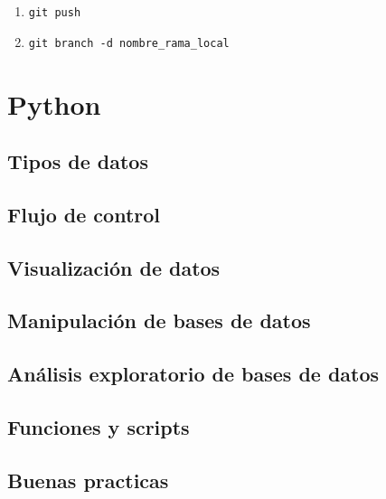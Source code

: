\documentclass[
]{book}
\begin{document}
\begin{enumerate}
\def\labelenumi{\arabic{enumi})}
\setcounter{enumi}{9}
\item
  \texttt{git\ push}
\item
  \texttt{git\ branch\ -d\ nombre\_rama\_local}
\end{enumerate}

\hypertarget{python}{%
\chapter{Python}\label{python}}

\hypertarget{tipos-de-datos}{%
\section{Tipos de datos}\label{tipos-de-datos}}

\hypertarget{flujo-de-control}{%
\section{Flujo de control}\label{flujo-de-control}}

\hypertarget{visualizaciuxf3n-de-datos}{%
\section{Visualización de datos}\label{visualizaciuxf3n-de-datos}}

\hypertarget{manipulaciuxf3n-de-bases-de-datos}{%
\section{Manipulación de bases de datos}\label{manipulaciuxf3n-de-bases-de-datos}}

\hypertarget{anuxe1lisis-exploratorio-de-bases-de-datos}{%
\section{Análisis exploratorio de bases de datos}\label{anuxe1lisis-exploratorio-de-bases-de-datos}}

\hypertarget{funciones-y-scripts}{%
\section{Funciones y scripts}\label{funciones-y-scripts}}

\hypertarget{buenas-practicas}{%
\section{Buenas practicas}\label{buenas-practicas}}
\end{document}
